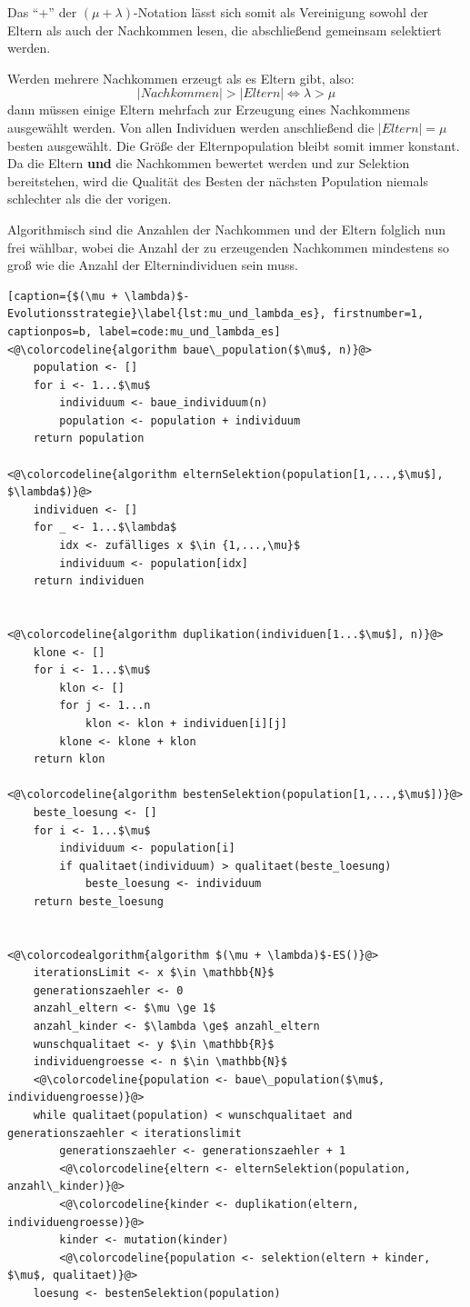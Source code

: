 Das \enquote{+} der $(\mu + \lambda)$-Notation lässt sich somit als Vereinigung sowohl der Eltern als auch der Nachkommen lesen, die abschließend gemeinsam selektiert werden.

Werden mehrere Nachkommen erzeugt als es Eltern gibt, also:
\begin{equation}
|Nachkommen| > |Eltern| \Leftrightarrow \lambda > \mu
\end{equation}
dann müssen einige Eltern mehrfach zur Erzeugung eines Nachkommens ausgewählt werden.
Von allen Individuen werden anschließend die $|Eltern| = \mu$ besten ausgewählt. Die Größe der Elternpopulation bleibt somit immer konstant. Da die Eltern \textbf{und} die Nachkommen bewertet werden und zur Selektion bereitstehen, wird die Qualität des Besten der nächsten Population niemals schlechter als die der vorigen.

Algorithmisch sind die Anzahlen der Nachkommen und der Eltern folglich nun frei wählbar, wobei die Anzahl der zu erzeugenden Nachkommen mindestens so groß wie die Anzahl der Elternindividuen sein muss.

\begin{lstlisting}[caption={$(\mu + \lambda)$-Evolutionsstrategie}\label{lst:mu_und_lambda_es}, firstnumber=1, captionpos=b, label=code:mu_und_lambda_es]
<@\colorcodeline{algorithm baue\_population($\mu$, n)}@>
	population <- []
	for i <- 1...$\mu$
		individuum <- baue_individuum(n)
		population <- population + individuum
	return population
	
<@\colorcodeline{algorithm elternSelektion(population[1,...,$\mu$], $\lambda$)}@>
	individuen <- []
	for _ <- 1...$\lambda$
		idx <- zufälliges x $\in {1,...,\mu}$
		individuum <- population[idx]
	return individuen
	

<@\colorcodeline{algorithm duplikation(individuen[1...$\mu$], n)}@>
	klone <- []
	for i <- 1...$\mu$
		klon <- []
		for j <- 1...n
			klon <- klon + individuen[i][j]
		klone <- klone + klon
	return klon
	
<@\colorcodeline{algorithm bestenSelektion(population[1,...,$\mu$])}@>
	beste_loesung <- []
	for i <- 1...$\mu$
		individuum <- population[i]
		if qualitaet(individuum) > qualitaet(beste_loesung)
			beste_loesung <- individuum
	return beste_loesung
	

<@\colorcodealgorithm{algorithm $(\mu + \lambda)$-ES()}@>
	iterationsLimit <- x $\in \mathbb{N}$
	generationszaehler <- 0
	anzahl_eltern <- $\mu \ge 1$
	anzahl_kinder <- $\lambda \ge$ anzahl_eltern
	wunschqualitaet <- y $\in \mathbb{R}$
	individuengroesse <- n $\in \mathbb{N}$
	<@\colorcodeline{population <- baue\_population($\mu$, individuengroesse)}@>
	while qualitaet(population) < wunschqualitaet and generationszaehler < iterationslimit
		generationszaehler <- generationszaehler + 1
		<@\colorcodeline{eltern <- elternSelektion(population, anzahl\_kinder)}@>
		<@\colorcodeline{kinder <- duplikation(eltern, individuengroesse)}@>
		kinder <- mutation(kinder)
		<@\colorcodeline{population <- selektion(eltern + kinder, $\mu$, qualitaet)}@>
	loesung <- bestenSelektion(population)
\end{lstlisting}

